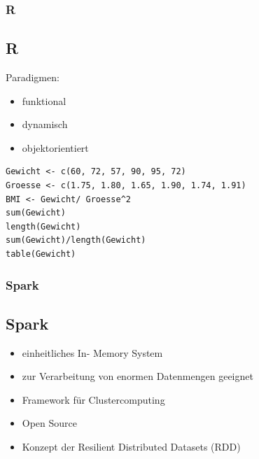 \documentclass[11pt]{beamer}
\begin{document}

\begin{frame}[fragile]
\frametitle{R}
\subsection{R}
Paradigmen:
\begin{itemize}
	\item funktional
	\item dynamisch
	\item objektorientiert
\end{itemize}


\lstset{
	language=R,
	basicstyle=\footnotesize,
	numbers=left,
	numbersep=5pt,
	showtabs=false,
	title=R Beispiel Code,
	style=customc
}
\begin{lstlisting}
Gewicht <- c(60, 72, 57, 90, 95, 72)
Groesse <- c(1.75, 1.80, 1.65, 1.90, 1.74, 1.91)
BMI <- Gewicht/ Groesse^2
sum(Gewicht)
length(Gewicht)
sum(Gewicht)/length(Gewicht)
table(Gewicht)
\end{lstlisting}

\end{frame}

\begin{frame}[fragile]
\frametitle{Spark}
\subsection{Spark}
\begin{itemize}
	\item einheitliches In- Memory System 
	\item zur Verarbeitung von enormen Datenmengen geeignet
	\item Framework für Clustercomputing 
	\item Open Source 
	\item Konzept der Resilient Distributed Datasets (RDD)
\end{itemize}
\end{frame}
\end{document}
